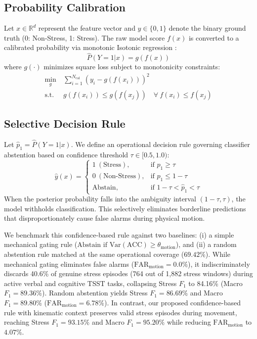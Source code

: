 \documentclass[conference]{IEEEtran}
\begin{document}
\subsection{Probability Calibration}
Let $x \in \mathbb{R}^d$ represent the feature vector and $y \in \{0, 1\}$ denote the binary ground truth (0: Non-Stress, 1: Stress). The raw model score $f(x)$ is converted to a calibrated probability via monotonic Isotonic regression \cite{zadrozny2002transforming, niculescu2005predicting}:
\begin{equation}
\hat{P}(Y=1|x) = g(f(x))
\end{equation}
where $g(\cdot)$ minimizes square loss subject to monotonicity constraints:
\begin{equation}
\begin{aligned}
\min_{g} \ & \sum_{i=1}^{N_{\text{cal}}} \left( y_i - g(f(x_i)) \right)^2 \\
\text{s.t.} \ & g(f(x_i)) \le g(f(x_j)) \quad \forall \ f(x_i) \le f(x_j)
\end{aligned}
\end{equation}

\subsection{Selective Decision Rule}
Let $\hat{p}_1 = \hat{P}(Y=1|x)$. We define an operational decision rule governing classifier abstention based on confidence threshold $\tau \in [0.5, 1.0)$:
\begin{equation}
\hat{y}(x) =
\begin{cases}
1 \ (\text{Stress}), & \text{if } \hat{p}_1 \ge \tau \\
0 \ (\text{Non-Stress}), & \text{if } \hat{p}_1 \le 1 - \tau \\
\text{Abstain}, & \text{if } 1 - \tau < \hat{p}_1 < \tau
\end{cases}
\end{equation}
When the posterior probability falls into the ambiguity interval $(1-\tau, \tau)$, the model withholds classification. This selectively eliminates borderline predictions that disproportionately cause false alarms during physical motion.

We benchmark this confidence-based rule against two baselines: (i) a simple mechanical gating rule ($\text{Abstain if } \text{Var}(\text{ACC}) \ge \theta_{\text{motion}}$), and (ii) a random abstention rule matched at the same operational coverage ($69.42\%$). While mechanical gating eliminates false alarms ($\text{FAR}_{\text{motion}} = 0.0\%$), it indiscriminately discards 40.6\% of genuine stress episodes (764 out of 1,882 stress windows) during active verbal and cognitive TSST tasks, collapsing Stress $F_1$ to 84.16\% (Macro $F_1 = 89.36\%$). Random abstention yields Stress $F_1 = 86.69\%$ and Macro $F_1 = 89.80\%$ ($\text{FAR}_{\text{motion}} = 6.78\%$). In contrast, our proposed confidence-based rule with kinematic context preserves valid stress episodes during movement, reaching Stress $F_1 = 93.15\%$ and Macro $F_1 = 95.20\%$ while reducing $\text{FAR}_{\text{motion}}$ to $4.07\%$.
\end{document}
